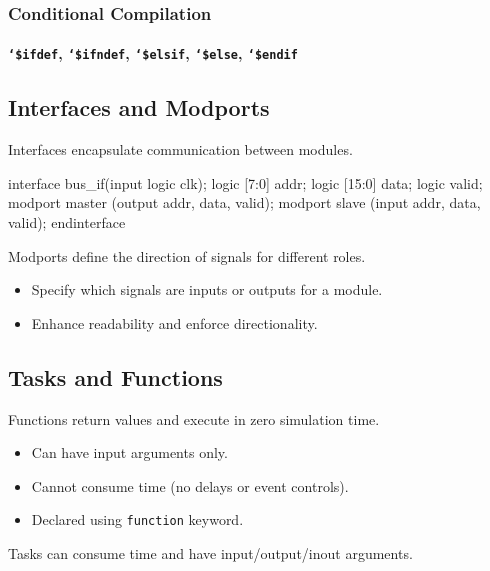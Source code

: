 \subsubsection{Conditional Compilation}
\paragraph{\texttt{`\$ifdef}, \texttt{`\$ifndef}, \texttt{`\$elsif}, \texttt{`\$else}, \texttt{`\$endif}}

\subsection{Interfaces and Modports}

Interfaces encapsulate communication between modules.
\begin{verilogcode}
interface bus_if(input logic clk);
    logic [7:0] addr;
    logic [15:0] data;
    logic valid;
    modport master (output addr, data, valid);
    modport slave (input addr, data, valid);
endinterface
\end{verilogcode}

Modports define the direction of signals for different roles.

\begin{itemize}
    \item Specify which signals are inputs or outputs for a module.
    \item Enhance readability and enforce directionality.
\end{itemize}

\subsection{Tasks and Functions}
Functions return values and execute in zero simulation time.
\begin{itemize}
    \item Can have input arguments only.
    \item Cannot consume time (no delays or event controls).
    \item Declared using \texttt{function} keyword.
\end{itemize}

Tasks can consume time and have input/output/inout arguments.

